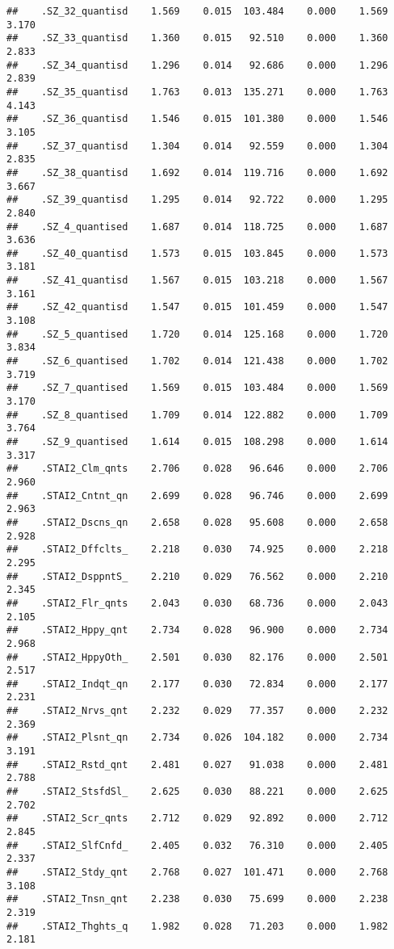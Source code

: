 \documentclass[]{article}
\begin{document}
\begin{verbatim}
##    .SZ_32_quantisd    1.569    0.015  103.484    0.000    1.569    3.170
##    .SZ_33_quantisd    1.360    0.015   92.510    0.000    1.360    2.833
##    .SZ_34_quantisd    1.296    0.014   92.686    0.000    1.296    2.839
##    .SZ_35_quantisd    1.763    0.013  135.271    0.000    1.763    4.143
##    .SZ_36_quantisd    1.546    0.015  101.380    0.000    1.546    3.105
##    .SZ_37_quantisd    1.304    0.014   92.559    0.000    1.304    2.835
##    .SZ_38_quantisd    1.692    0.014  119.716    0.000    1.692    3.667
##    .SZ_39_quantisd    1.295    0.014   92.722    0.000    1.295    2.840
##    .SZ_4_quantised    1.687    0.014  118.725    0.000    1.687    3.636
##    .SZ_40_quantisd    1.573    0.015  103.845    0.000    1.573    3.181
##    .SZ_41_quantisd    1.567    0.015  103.218    0.000    1.567    3.161
##    .SZ_42_quantisd    1.547    0.015  101.459    0.000    1.547    3.108
##    .SZ_5_quantised    1.720    0.014  125.168    0.000    1.720    3.834
##    .SZ_6_quantised    1.702    0.014  121.438    0.000    1.702    3.719
##    .SZ_7_quantised    1.569    0.015  103.484    0.000    1.569    3.170
##    .SZ_8_quantised    1.709    0.014  122.882    0.000    1.709    3.764
##    .SZ_9_quantised    1.614    0.015  108.298    0.000    1.614    3.317
##    .STAI2_Clm_qnts    2.706    0.028   96.646    0.000    2.706    2.960
##    .STAI2_Cntnt_qn    2.699    0.028   96.746    0.000    2.699    2.963
##    .STAI2_Dscns_qn    2.658    0.028   95.608    0.000    2.658    2.928
##    .STAI2_Dffclts_    2.218    0.030   74.925    0.000    2.218    2.295
##    .STAI2_DsppntS_    2.210    0.029   76.562    0.000    2.210    2.345
##    .STAI2_Flr_qnts    2.043    0.030   68.736    0.000    2.043    2.105
##    .STAI2_Hppy_qnt    2.734    0.028   96.900    0.000    2.734    2.968
##    .STAI2_HppyOth_    2.501    0.030   82.176    0.000    2.501    2.517
##    .STAI2_Indqt_qn    2.177    0.030   72.834    0.000    2.177    2.231
##    .STAI2_Nrvs_qnt    2.232    0.029   77.357    0.000    2.232    2.369
##    .STAI2_Plsnt_qn    2.734    0.026  104.182    0.000    2.734    3.191
##    .STAI2_Rstd_qnt    2.481    0.027   91.038    0.000    2.481    2.788
##    .STAI2_StsfdSl_    2.625    0.030   88.221    0.000    2.625    2.702
##    .STAI2_Scr_qnts    2.712    0.029   92.892    0.000    2.712    2.845
##    .STAI2_SlfCnfd_    2.405    0.032   76.310    0.000    2.405    2.337
##    .STAI2_Stdy_qnt    2.768    0.027  101.471    0.000    2.768    3.108
##    .STAI2_Tnsn_qnt    2.238    0.030   75.699    0.000    2.238    2.319
##    .STAI2_Thghts_q    1.982    0.028   71.203    0.000    1.982    2.181

\end{verbatim}
\end{document}
